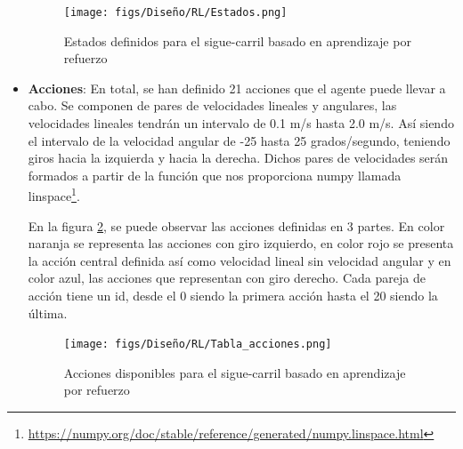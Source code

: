 \begin{itemize}
    \begin{figure} [H]
      \begin{center}
        \texttt{[image: figs/Diseño/RL/Estados.png]}
      \end{center}
      \caption{Estados definidos para el sigue-carril basado en aprendizaje por refuerzo}
      \label{fig:Estados}
    \end{figure}

    \item \textbf{Acciones}: En total, se han definido 21 acciones que el agente puede llevar a cabo. Se componen de pares de velocidades lineales y angulares, las velocidades lineales
    tendrán un intervalo de 0.1 m/s hasta 2.0 m/s. Así siendo el intervalo de la velocidad angular de -25 hasta 25 grados/segundo, teniendo giros hacia la izquierda y hacia la derecha. Dichos pares
    de velocidades serán formados a partir de la función que nos proporciona numpy llamada linspace\footnote{\url{https://numpy.org/doc/stable/reference/generated/numpy.linspace.html}}. \newline

    En la figura \ref{fig:Acciones}, se puede observar las acciones definidas en 3 partes. En color naranja se representa las acciones con giro izquierdo, en color rojo se presenta 
    la acción central definida así como velocidad lineal sin velocidad angular y en color azul, las acciones que representan con giro derecho. Cada pareja de acción tiene un id, desde el 0
    siendo la primera acción hasta el 20 siendo la última. \newline
  
    \begin{figure} [H]
      \begin{center}
        \texttt{[image: figs/Diseño/RL/Tabla\_acciones.png]}
      \end{center}
      \caption{Acciones disponibles para el sigue-carril basado en aprendizaje por refuerzo}
      \label{fig:Acciones}
    \end{figure}
  

\end{itemize}
